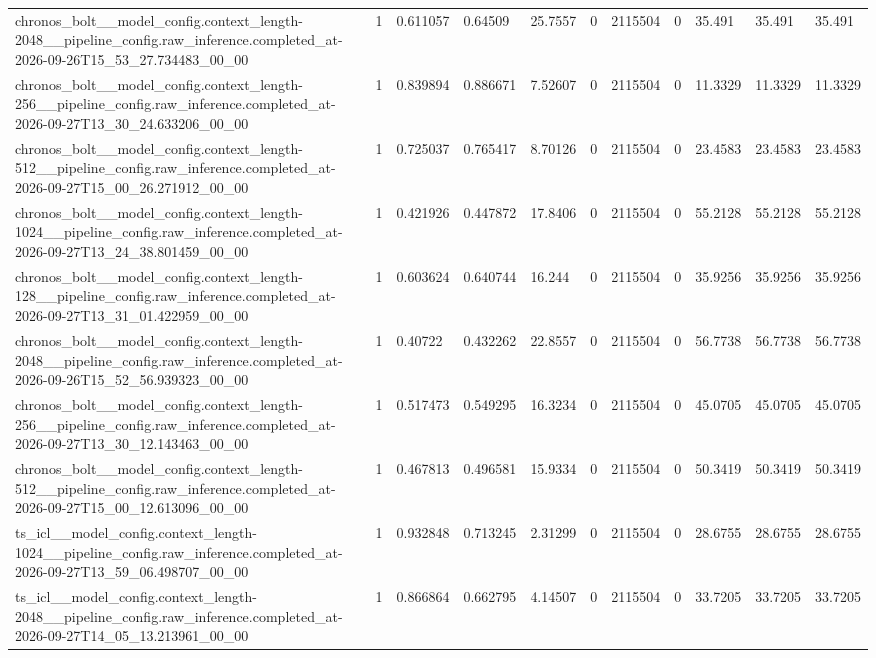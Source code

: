 \begin{tabular}{lllllllllll}
chronos\_bolt\_\_model\_config.context\_length-2048\_\_pipeline\_config.raw\_inference.completed\_at-2026-09-26T15\_53\_27.734483\_00\_00 & 1 & 0.611057 & 0.64509 & 25.7557 & 0 & 2115504 & 0 & 35.491 & 35.491 & 35.491 \\
chronos\_bolt\_\_model\_config.context\_length-256\_\_pipeline\_config.raw\_inference.completed\_at-2026-09-27T13\_30\_24.633206\_00\_00 & 1 & 0.839894 & 0.886671 & 7.52607 & 0 & 2115504 & 0 & 11.3329 & 11.3329 & 11.3329 \\
chronos\_bolt\_\_model\_config.context\_length-512\_\_pipeline\_config.raw\_inference.completed\_at-2026-09-27T15\_00\_26.271912\_00\_00 & 1 & 0.725037 & 0.765417 & 8.70126 & 0 & 2115504 & 0 & 23.4583 & 23.4583 & 23.4583 \\
chronos\_bolt\_\_model\_config.context\_length-1024\_\_pipeline\_config.raw\_inference.completed\_at-2026-09-27T13\_24\_38.801459\_00\_00 & 1 & 0.421926 & 0.447872 & 17.8406 & 0 & 2115504 & 0 & 55.2128 & 55.2128 & 55.2128 \\
chronos\_bolt\_\_model\_config.context\_length-128\_\_pipeline\_config.raw\_inference.completed\_at-2026-09-27T13\_31\_01.422959\_00\_00 & 1 & 0.603624 & 0.640744 & 16.244 & 0 & 2115504 & 0 & 35.9256 & 35.9256 & 35.9256 \\
chronos\_bolt\_\_model\_config.context\_length-2048\_\_pipeline\_config.raw\_inference.completed\_at-2026-09-26T15\_52\_56.939323\_00\_00 & 1 & 0.40722 & 0.432262 & 22.8557 & 0 & 2115504 & 0 & 56.7738 & 56.7738 & 56.7738 \\
chronos\_bolt\_\_model\_config.context\_length-256\_\_pipeline\_config.raw\_inference.completed\_at-2026-09-27T13\_30\_12.143463\_00\_00 & 1 & 0.517473 & 0.549295 & 16.3234 & 0 & 2115504 & 0 & 45.0705 & 45.0705 & 45.0705 \\
chronos\_bolt\_\_model\_config.context\_length-512\_\_pipeline\_config.raw\_inference.completed\_at-2026-09-27T15\_00\_12.613096\_00\_00 & 1 & 0.467813 & 0.496581 & 15.9334 & 0 & 2115504 & 0 & 50.3419 & 50.3419 & 50.3419 \\
ts\_icl\_\_model\_config.context\_length-1024\_\_pipeline\_config.raw\_inference.completed\_at-2026-09-27T13\_59\_06.498707\_00\_00 & 1 & 0.932848 & 0.713245 & 2.31299 & 0 & 2115504 & 0 & 28.6755 & 28.6755 & 28.6755 \\
ts\_icl\_\_model\_config.context\_length-2048\_\_pipeline\_config.raw\_inference.completed\_at-2026-09-27T14\_05\_13.213961\_00\_00 & 1 & 0.866864 & 0.662795 & 4.14507 & 0 & 2115504 & 0 & 33.7205 & 33.7205 & 33.7205 \\

\end{tabular}

